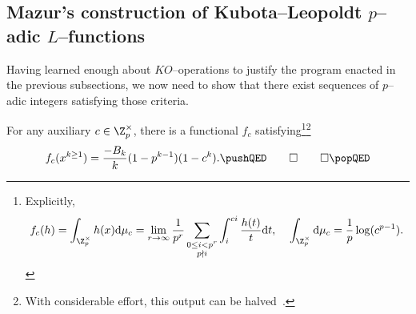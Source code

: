 \subsection{Mazur's construction of Kubota--Leopoldt \(p\)--adic \(L\)--functions}

Having learned enough about \(KO\)--operations to justify the program enacted in the previous subsections, we now need to show that there exist sequences of \(p\)--adic integers satisfying those criteria.

\begin{theorem}
For any auxiliary \(c \in \Z_p^\times\), there is a functional \(f_c\) satisfying\footnote{Explicitly, \[f_c(h) = \int_{\Z_p^\times} h(x) \mathrm d\mu_c = \lim_{r \to \infty} \frac{1}{p^r} \sum_{\substack{0 \le i < p^r \\ p \nmid i}} \int_i^{ci} \frac{h(t)}{t} \mathrm dt, \; \; \; \; \int_{\Z_p^\times} \mathrm d\mu_c = \frac{1}{p} \log(c^{p-1}).\]}\footnote{With considerable effort, this output can be halved~\cite[Section 10.3]{AHR}.} \[f_c(x^{k \ge 1}) = \frac{-B_k}{k}(1 - p^{k-1})(1 - c^k).  \pushQED\qed \qedhere \popQED\]
\end{theorem}


